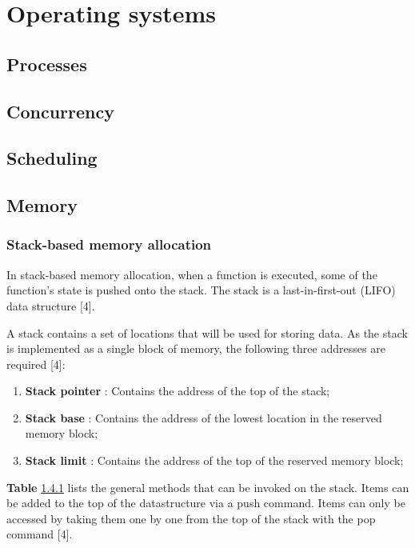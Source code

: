 \chapter{Operating systems}\label{chapter:operating-systems}

\section{Processes}

\section{Concurrency}

\section{Scheduling}

\section{Memory}

\subsection{Stack-based memory allocation}

In stack-based memory allocation, when a function is executed, some of the function's state is pushed onto the stack. The stack is a last-in-first-out (LIFO) data structure [4].

A stack contains a set of locations that will be used for storing data. As the stack is implemented as a single block of memory, the following three addresses are required [4]:
\begin{enumerate}
	\item \textbf{Stack pointer} : Contains the address of the top of the stack;
	\item \textbf{Stack base} : Contains the address of the lowest location in the reserved memory block;
	\item \textbf{Stack limit} : Contains the address of the top of the reserved memory block;
\end{enumerate}


\textbf{Table} \ref{} lists the general methods that can be invoked on the stack. Items can be added to the top of the datastructure via a push command. Items can only be accessed by taking them one by one from the top of the stack with the pop command [4].

